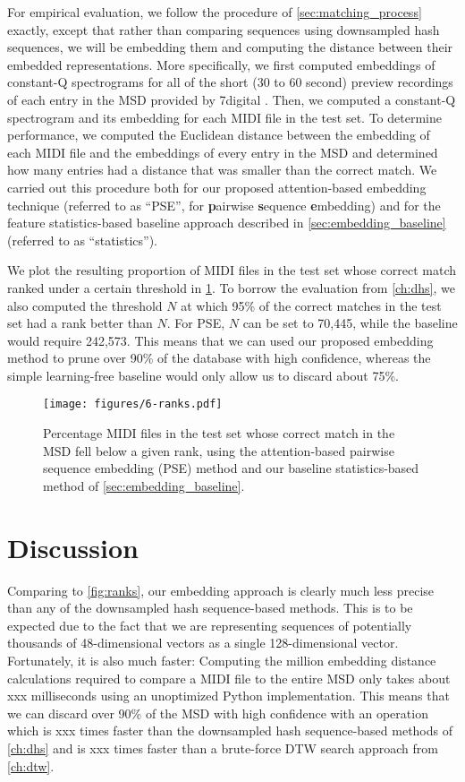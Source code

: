 For empirical evaluation, we follow the procedure of \cref{sec:matching_process} exactly, except that rather than comparing sequences using downsampled hash sequences, we will be embedding them and computing the distance between their embedded representations.
More specifically, we first computed embeddings of constant-Q spectrograms for all of the short (30 to 60 second) preview recordings of each entry in the MSD provided by 7digital \cite{schindler2012facilitating}.
Then, we computed a constant-Q spectrogram and its embedding for each MIDI file in the test set.
To determine performance, we computed the Euclidean distance between the embedding of each MIDI file and the embeddings of every entry in the MSD and determined how many entries had a distance that was smaller than the correct match.
We carried out this procedure both for our proposed attention-based embedding technique (referred to as ``PSE'', for \textbf{p}airwise \textbf{s}equence \textbf{e}mbedding) and for the feature statistics-based baseline approach described in \cref{sec:embedding_baseline} (referred to as ``statistics'').

We plot the resulting proportion of MIDI files in the test set whose correct match ranked under a certain threshold in \cref{fig:embedding_ranks}.
To borrow the evaluation from \cref{ch:dhs}, we also computed the threshold $N$ at which 95\% of the correct matches in the test set had a rank better than $N$.
For PSE, $N$ can be set to 70,445, while the baseline would require 242,573.
This means that we can used our proposed embedding method to prune over 90\% of the database with high confidence, whereas the simple learning-free baseline would only allow us to discard about 75\%.

\begin{figure}
  \texttt{[image: figures/6-ranks.pdf]}
  \caption[Percentage of the test set below a given rank]{Percentage MIDI files in the test set whose correct match in the MSD fell below a given rank, using the attention-based pairwise sequence embedding (PSE) method and our baseline statistics-based method of \cref{sec:embedding_baseline}.}
  \label{fig:embedding_ranks}
\end{figure}

\section{Discussion}
\label{sec:pse_discussion}

Comparing to \cref{fig:ranks}, our embedding approach is clearly much less precise than any of the downsampled hash sequence-based methods.
This is to be expected due to the fact that we are representing sequences of potentially thousands of 48-dimensional vectors as a single 128-dimensional vector.
Fortunately, it is also much faster: Computing the million embedding distance calculations required to compare a MIDI file to the entire MSD only takes about xxx milliseconds using an unoptimized Python implementation.
This means that we can discard over 90\% of the MSD with high confidence with an operation which is xxx times faster than the downsampled hash sequence-based methods of \cref{ch:dhs} and is xxx times faster than a brute-force DTW search approach from \cref{ch:dtw}.


